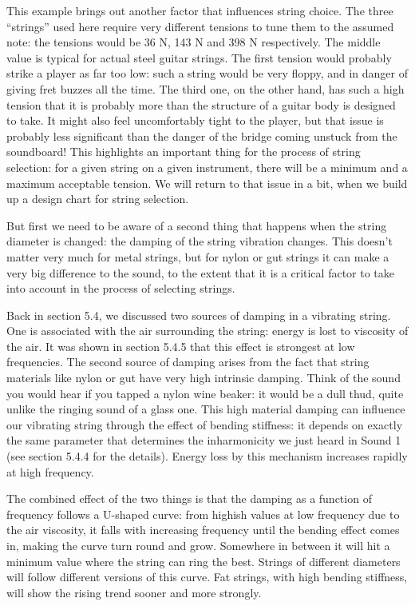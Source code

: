   This example brings out another factor that influences string choice. The 
  three ``strings'' used here require very different tensions to tune them to 
  the assumed note: the tensions would be 36 N, 143 N and 398 N respectively. 
  The middle value is typical for actual steel guitar strings. The first 
  tension would probably strike a player as far too low: such a string would be 
  very floppy, and in danger of giving fret buzzes all the time. The third one, 
  on the other hand, has such a high tension that it is probably more than the 
  structure of a guitar body is designed to take. It might also feel 
  uncomfortably tight to the player, but that issue is probably less 
  significant than the danger of the bridge coming unstuck from the soundboard! 
  This highlights an important thing for the process of string selection: for a 
  given string on a given instrument, there will be a minimum and a maximum 
  acceptable tension. We will return to that issue in a bit, when we build up a 
  design chart for string selection. 

  But first we need to be aware of a second thing that happens when the string 
  diameter is changed: the damping of the string vibration changes. This 
  doesn't matter very much for metal strings, but for nylon or gut strings it 
  can make a very big difference to the sound, to the extent that it is a 
  critical factor to take into account in the process of selecting strings. 

  Back in section 5.4, we discussed two sources of damping in a vibrating 
  string. One is associated with the air surrounding the string: energy is lost 
  to viscosity of the air. It was shown in section 5.4.5 that this effect is 
  strongest at low frequencies. The second source of damping arises from the 
  fact that string materials like nylon or gut have very high intrinsic 
  damping. Think of the sound you would hear if you tapped a nylon wine beaker: 
  it would be a dull thud, quite unlike the ringing sound of a glass one. This 
  high material damping can influence our vibrating string through the effect 
  of bending stiffness: it depends on exactly the same parameter that 
  determines the inharmonicity we just heard in Sound 1 (see section 5.4.4 for 
  the details). Energy loss by this mechanism increases rapidly at high 
  frequency. 

  The combined effect of the two things is that the damping as a function of 
  frequency follows a U-shaped curve: from highish values at low frequency due 
  to the air viscosity, it falls with increasing frequency until the bending 
  effect comes in, making the curve turn round and grow. Somewhere in between 
  it will hit a minimum value where the string can ring the best. Strings of 
  different diameters will follow different versions of this curve. Fat 
  strings, with high bending stiffness, will show the rising trend sooner and 
  more strongly. 

